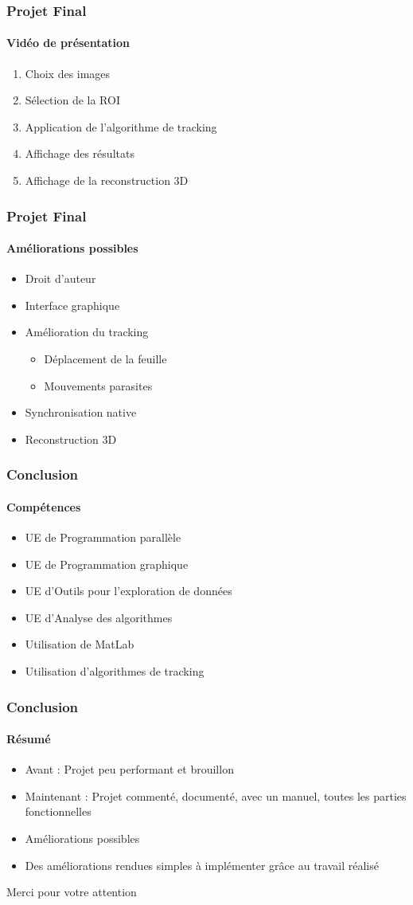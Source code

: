 \documentclass[12pt]{beamer}
\begin{document}
\begin{frame}
\frametitle{Projet Final}
\framesubtitle{Vidéo de présentation}
\begin{enumerate}
\item Choix des images
\item Sélection de la ROI
\item Application de l'algorithme de tracking
\item Affichage des résultats
\item Affichage de la reconstruction 3D
\end{enumerate}
\end{frame}

\begin{frame}
\frametitle{Projet Final}
\framesubtitle{Améliorations possibles}
\begin{itemize}
\item Droit d'auteur
\item Interface graphique
\item Amélioration du tracking
\begin{itemize}
\item Déplacement de la feuille
\item Mouvements parasites
\end{itemize}
\item Synchronisation native
\item Reconstruction 3D
\end{itemize}
\end{frame}

\begin{frame}
\frametitle{Conclusion}
\framesubtitle{Compétences}
\begin{itemize}
\item UE de Programmation parallèle
\item UE de Programmation graphique
\item UE d'Outils pour l'exploration de données
\item UE d'Analyse des algorithmes
\item Utilisation de MatLab
\item Utilisation d'algorithmes de tracking
\end{itemize}
\end{frame}

\begin{frame}
\frametitle{Conclusion}
\framesubtitle{Résumé}
\begin{itemize}
\item Avant : Projet peu performant et brouillon
\item Maintenant : Projet commenté, documenté, avec un manuel, toutes les parties fonctionnelles
\item Améliorations possibles
\item Des améliorations rendues simples à implémenter grâce au travail réalisé
\end{itemize}
\end{frame}

\begin{frame}
\Huge{\centerline{Merci pour votre attention}}
\end{frame}
\end{document}
